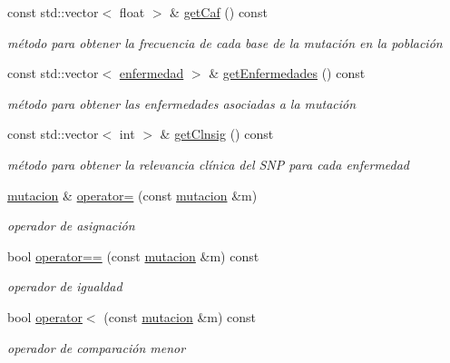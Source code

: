 \begin{DoxyCompactItemize}
const std\+::vector$<$ float $>$ \& \hyperlink{classmutacion_a2d60aed548b4b151bc2c198e989faa20}{get\+Caf} () const 
\begin{DoxyCompactList}\small\item\em método para obtener la frecuencia de cada base de la mutación en la población \end{DoxyCompactList}\item 
const std\+::vector$<$ \hyperlink{classenfermedad}{enfermedad} $>$ \& \hyperlink{classmutacion_aec4992d4eab534b66fb572ff985d0b02}{get\+Enfermedades} () const 
\begin{DoxyCompactList}\small\item\em método para obtener las enfermedades asociadas a la mutación \end{DoxyCompactList}\item 
const std\+::vector$<$ int $>$ \& \hyperlink{classmutacion_ad555ad20ff5cdb729fe7187e4547bc9f}{get\+Clnsig} () const 
\begin{DoxyCompactList}\small\item\em método para obtener la relevancia clínica del S\+NP para cada enfermedad \end{DoxyCompactList}\item 
\hyperlink{classmutacion}{mutacion} \& \hyperlink{classmutacion_a183a12f2fae6160c9f381bd48d719a23}{operator=} (const \hyperlink{classmutacion}{mutacion} \&m)
\begin{DoxyCompactList}\small\item\em operador de asignación \end{DoxyCompactList}\item 
bool \hyperlink{classmutacion_a2e36c20aeff8c7cc88abe84efe0b11be}{operator==} (const \hyperlink{classmutacion}{mutacion} \&m) const 
\begin{DoxyCompactList}\small\item\em operador de igualdad \end{DoxyCompactList}\item 
bool \hyperlink{classmutacion_a0ccb4444b7afd120dc4557fd05f9ca27}{operator$<$} (const \hyperlink{classmutacion}{mutacion} \&m) const 
\begin{DoxyCompactList}\small\item\em operador de comparación menor \end{DoxyCompactList}\end{DoxyCompactItemize}
